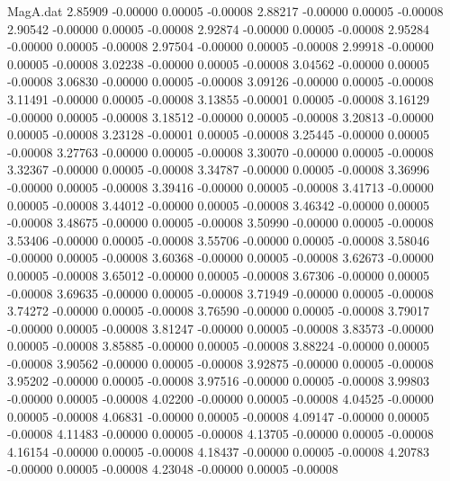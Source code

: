 \begin{filecontents}{MagA.dat}
   2.85909   -0.00000    0.00005   -0.00008
   2.88217   -0.00000    0.00005   -0.00008
   2.90542   -0.00000    0.00005   -0.00008
   2.92874   -0.00000    0.00005   -0.00008
   2.95284   -0.00000    0.00005   -0.00008
   2.97504   -0.00000    0.00005   -0.00008
   2.99918   -0.00000    0.00005   -0.00008
   3.02238   -0.00000    0.00005   -0.00008
   3.04562   -0.00000    0.00005   -0.00008
   3.06830   -0.00000    0.00005   -0.00008
   3.09126   -0.00000    0.00005   -0.00008
   3.11491   -0.00000    0.00005   -0.00008
   3.13855   -0.00001    0.00005   -0.00008
   3.16129   -0.00000    0.00005   -0.00008
   3.18512   -0.00000    0.00005   -0.00008
   3.20813   -0.00000    0.00005   -0.00008
   3.23128   -0.00001    0.00005   -0.00008
   3.25445   -0.00000    0.00005   -0.00008
   3.27763   -0.00000    0.00005   -0.00008
   3.30070   -0.00000    0.00005   -0.00008
   3.32367   -0.00000    0.00005   -0.00008
   3.34787   -0.00000    0.00005   -0.00008
   3.36996   -0.00000    0.00005   -0.00008
   3.39416   -0.00000    0.00005   -0.00008
   3.41713   -0.00000    0.00005   -0.00008
   3.44012   -0.00000    0.00005   -0.00008
   3.46342   -0.00000    0.00005   -0.00008
   3.48675   -0.00000    0.00005   -0.00008
   3.50990   -0.00000    0.00005   -0.00008
   3.53406   -0.00000    0.00005   -0.00008
   3.55706   -0.00000    0.00005   -0.00008
   3.58046   -0.00000    0.00005   -0.00008
   3.60368   -0.00000    0.00005   -0.00008
   3.62673   -0.00000    0.00005   -0.00008
   3.65012   -0.00000    0.00005   -0.00008
   3.67306   -0.00000    0.00005   -0.00008
   3.69635   -0.00000    0.00005   -0.00008
   3.71949   -0.00000    0.00005   -0.00008
   3.74272   -0.00000    0.00005   -0.00008
   3.76590   -0.00000    0.00005   -0.00008
   3.79017   -0.00000    0.00005   -0.00008
   3.81247   -0.00000    0.00005   -0.00008
   3.83573   -0.00000    0.00005   -0.00008
   3.85885   -0.00000    0.00005   -0.00008
   3.88224   -0.00000    0.00005   -0.00008
   3.90562   -0.00000    0.00005   -0.00008
   3.92875   -0.00000    0.00005   -0.00008
   3.95202   -0.00000    0.00005   -0.00008
   3.97516   -0.00000    0.00005   -0.00008
   3.99803   -0.00000    0.00005   -0.00008
   4.02200   -0.00000    0.00005   -0.00008
   4.04525   -0.00000    0.00005   -0.00008
   4.06831   -0.00000    0.00005   -0.00008
   4.09147   -0.00000    0.00005   -0.00008
   4.11483   -0.00000    0.00005   -0.00008
   4.13705   -0.00000    0.00005   -0.00008
   4.16154   -0.00000    0.00005   -0.00008
   4.18437   -0.00000    0.00005   -0.00008
   4.20783   -0.00000    0.00005   -0.00008
   4.23048   -0.00000    0.00005   -0.00008

\end{filecontents}
